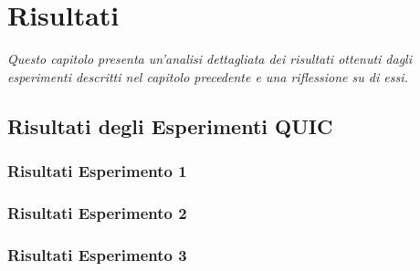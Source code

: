 \chapter{Risultati}
\label{cap:risultati}

\textit{\indent Questo capitolo presenta un'analisi dettagliata dei risultati ottenuti dagli esperimenti descritti nel capitolo precedente e una riflessione su di essi.}

\section{Risultati degli Esperimenti QUIC}
\subsection{Risultati Esperimento 1}
\subsection{Risultati Esperimento 2}
\subsection{Risultati Esperimento 3}
